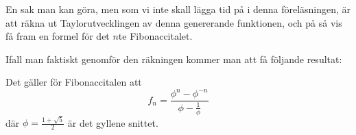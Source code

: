 \documentclass[nobib]{tufte-handout}
\begin{document}
En sak man kan göra, men som vi inte skall lägga tid på i denna föreläsningen, är att räkna ut Taylorutvecklingen av denna genererande funktionen, och på så vis få fram en formel för det $n$te Fibonaccitalet.

Ifall man faktiskt genomför den räkningen kommer man att få följande resultat:

\begin{proposition}
    Det gäller för Fibonaccitalen att
    $$f_n = \frac{\phi^n - \phi^{-n}}{\phi - \frac{1}{\phi}}$$
    där $\phi = \frac{1 + \sqrt{5}}{2}$ är det gyllene snittet.
\end{proposition}
\end{document}
